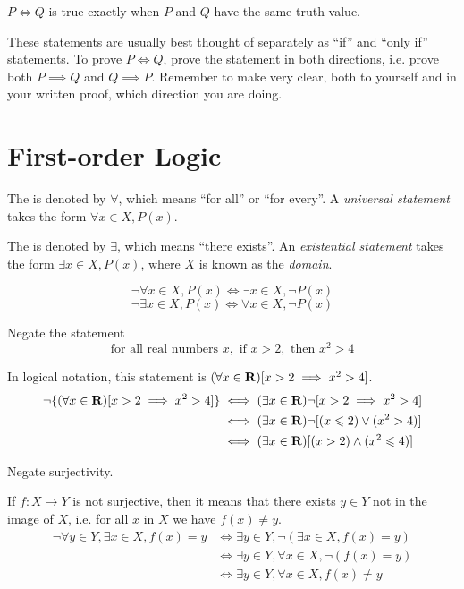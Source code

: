 $P \iff Q$ is true exactly when $P$ and $Q$ have the same truth value.

These statements are usually best thought of separately as ``if'' and ``only if'' statements. To prove $P \iff Q$, prove the statement in both directions, i.e. prove both $P \implies Q$ and $Q \implies P$. Remember to make very clear, both to yourself and in your written proof, which direction you are doing.

\section{First-order Logic}
The  is denoted by $\forall$, which means ``for all'' or ``for every''. A \emph{universal statement} takes the form $\forall x\in X, P(x)$.

The  is denoted by $\exists$, which means ``there exists''. An \emph{existential statement} takes the form $\exists x\in X, P(x)$, where $X$ is known as the \emph{domain}.

\begin{proposition}
\[ \lnot \forall x\in X,P(x) \iff \exists x\in X,\lnot P(x) \]
\[ \lnot \exists x\in X,P(x) \iff \forall x\in X,\lnot P(x) \]
\end{proposition}

\begin{exercise}
Negate the statement
\[ \text{for all real numbers } x, \text{ if } x>2, \text{ then } x^2>4 \]
\end{exercise}
\begin{solution}
In logical notation, this statement is $(\forall x \in \mathbf R)[x>2 \implies x^2>4]$.
\begin{align*}
\lnot\{(\forall x \in \mathbf R)[x>2 \implies x^2>4]\} 
&\iff (\exists x \in \mathbf R) \lnot[x>2 \implies x^2>4] \\
&\iff (\exists x \in \mathbf R) \lnot [(x\leqslant2) \lor (x^2>4)] \\
&\iff (\exists x \in \mathbf R) [(x>2) \land (x^2\leqslant4)]
\end{align*}
\end{solution}

\begin{exercise}
Negate surjectivity.
\end{exercise}
\begin{solution}
If $f:X\to Y$ is not surjective, then it means that there exists $y \in Y$ not in the image of $X$, i.e. for all $x$ in $X$ we have $f(x)\neq y$.
\begin{align*}
\lnot \forall y \in Y, \exists x \in X, f(x)=y 
&\iff \exists y \in Y, \lnot (\exists x \in X, f(x)=y) \\
&\iff \exists y \in Y, \forall x \in X, \lnot (f(x)=y) \\
&\iff \exists y \in Y, \forall x \in X, f(x) \neq y
\end{align*}
\end{solution}

